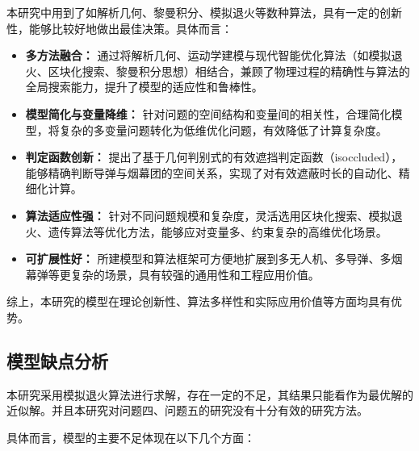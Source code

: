 \documentclass{article}
\begin{document}
本研究中用到了如解析几何、黎曼积分、模拟退火等数种算法，具有一定的创新性，能够比较好地做出最佳决策。具体而言：

\begin{itemize}
    \item \textbf{多方法融合：} 通过将解析几何、运动学建模与现代智能优化算法（如模拟退火、区块化搜索、黎曼积分思想）相结合，兼顾了物理过程的精确性与算法的全局搜索能力，提升了模型的适应性和鲁棒性。
    \item \textbf{模型简化与变量降维：} 针对问题的空间结构和变量间的相关性，合理简化模型，将复杂的多变量问题转化为低维优化问题，有效降低了计算复杂度。
    \item \textbf{判定函数创新：} 提出了基于几何判别式的有效遮挡判定函数（isoccluded），能够精确判断导弹与烟幕团的空间关系，实现了对有效遮蔽时长的自动化、精细化计算。
    \item \textbf{算法适应性强：} 针对不同问题规模和复杂度，灵活选用区块化搜索、模拟退火、遗传算法等优化方法，能够应对变量多、约束复杂的高维优化场景。
    \item \textbf{可扩展性好：} 所建模型和算法框架可方便地扩展到多无人机、多导弹、多烟幕弹等更复杂的场景，具有较强的通用性和工程应用价值。
\end{itemize}

综上，本研究的模型在理论创新性、算法多样性和实际应用价值等方面均具有优势。

\subsection{模型缺点分析}
本研究采用模拟退火算法进行求解，存在一定的不足，其结果只能看作为最优解的近似解。并且本研究对问题四、问题五的研究没有十分有效的研究方法。

具体而言，模型的主要不足体现在以下几个方面：
\end{document}

